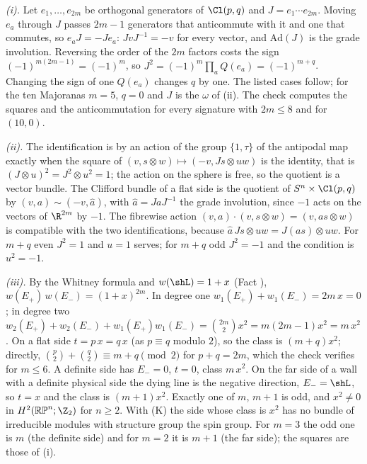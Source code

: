 \emph{(i).} Let $e_{1}, \dots, e_{2m}$ be orthogonal generators of $\Cl(p,q)$ and $J = e_{1}\cdots e_{2m}$. Moving $e_{a}$ through $J$ passes $2m - 1$ generators that anticommute with it and one that commutes, so $e_{a}J = -Je_{a}$: $JvJ^{-1} = -v$ for every vector, and $\mathrm{Ad}(J)$ is the grade involution. Reversing the order of the $2m$ factors costs the sign $(-1)^{m(2m-1)} = (-1)^{m}$, so $J^{2} = (-1)^{m}\prod_{a}Q(e_{a}) = (-1)^{m+q}$. Changing the sign of one $Q(e_{a})$ changes $q$ by one. The listed cases follow; for the ten Majoranas $m = 5$, $q = 0$ and $J$ is the $\omega$ of (ii). The check computes the squares and the anticommutation for every signature with $2m \leq 8$ and for $(10,0)$.

\emph{(ii).} The identification is by an action of the group $\{1, \tau\}$ of the antipodal map exactly when the square of $(v, s \otimes w) \mapsto (-v, Js \otimes uw)$ is the identity, that is $(J \otimes u)^{2} = J^{2} \otimes u^{2} = 1$; the action on the sphere is free, so the quotient is a vector bundle. The Clifford bundle of a flat side is the quotient of $S^{n} \times \Cl(p,q)$ by $(v, a) \sim (-v, \hat{a})$, with $\hat{a} = JaJ^{-1}$ the grade involution, since $-1$ acts on the vectors of $\R^{2m}$ by $-1$. The fibrewise action $(v, a)\cdot(v, s \otimes w) = (v, as \otimes w)$ is compatible with the two identifications, because $\hat{a}\,Js \otimes uw = J(as) \otimes uw$. For $m + q$ even $J^{2} = 1$ and $u = 1$ serves; for $m + q$ odd $J^{2} = -1$ and the condition is $u^{2} = -1$.

\emph{(iii).} By the Whitney formula and $w(\shL) = 1 + x$ (Fact ), $w(E_{+})\,w(E_{-}) = (1 + x)^{2m}$. In degree one $w_{1}(E_{+}) + w_{1}(E_{-}) = 2m\,x = 0$; in degree two $w_{2}(E_{+}) + w_{2}(E_{-}) + w_{1}(E_{+})w_{1}(E_{-}) = \binom{2m}{2}x^{2} = m(2m - 1)x^{2} = m\,x^{2}$. On a flat side $t = p\,x = q\,x$ (as $p \equiv q$ modulo $2$), so the class is $(m + q)x^{2}$; directly, $\binom{p}{2} + \binom{q}{2} \equiv m + q \pmod 2$ for $p + q = 2m$, which the check verifies for $m \leq 6$. A definite side has $E_{-} = 0$, $t = 0$, class $m\,x^{2}$. On the far side of a wall with a definite physical side the dying line is the negative direction, $E_{-} = \shL$, so $t = x$ and the class is $(m + 1)x^{2}$. Exactly one of $m$, $m + 1$ is odd, and $x^{2} \neq 0$ in $H^{2}(\mathbb{RP}^{n}; \Z_{2})$ for $n \geq 2$. With (K) the side whose class is $x^{2}$ has no bundle of irreducible modules with structure group the spin group. For $m = 3$ the odd one is $m$ (the definite side) and for $m = 2$ it is $m + 1$ (the far side); the squares are those of (i).

